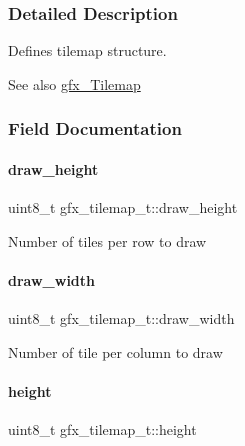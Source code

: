 \subsubsection{Detailed Description}
Defines tilemap structure. 

\begin{DoxySeeAlso}{See also}
\hyperlink{graphx_8h_a4abf31dc8ccc950d42cd29371947ac1c}{gfx\+\_\+\+Tilemap} 
\end{DoxySeeAlso}


\subsubsection{Field Documentation}
\mbox{\label{structgfx__tilemap__t_a5dd664c5691e669782e067cbe6ba0ad8}} 
\paragraph{\texorpdfstring{draw\+\_\+height}{draw\_height}}
{\footnotesize\ttfamily uint8\+\_\+t gfx\+\_\+tilemap\+\_\+t\+::draw\+\_\+height}

Number of tiles per row to draw \mbox{\label{structgfx__tilemap__t_a15929def589462587871049ab6ce4e98}} 
\paragraph{\texorpdfstring{draw\+\_\+width}{draw\_width}}
{\footnotesize\ttfamily uint8\+\_\+t gfx\+\_\+tilemap\+\_\+t\+::draw\+\_\+width}

Number of tile per column to draw \mbox{\label{structgfx__tilemap__t_aa69f824ad3ff8665a4d4fc0f47c239a9}} 
\paragraph{\texorpdfstring{height}{height}}
{\footnotesize\ttfamily uint8\+\_\+t gfx\+\_\+tilemap\+\_\+t\+::height}

